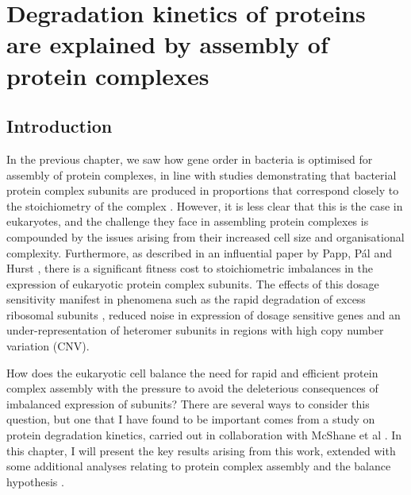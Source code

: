 \documentclass[a4paper,11pt,twoside,openright]{scrbook}
\begin{document}
\chapter{Degradation kinetics of proteins are explained by assembly of protein complexes}\label{chapter:degradation}

\section{Introduction}
In the previous chapter, we saw how gene order in bacteria is optimised for assembly of protein complexes, in line with studies demonstrating that bacterial protein complex subunits are produced in proportions that correspond closely to the stoichiometry of the complex \cite{Li2014b,Burkhardt2017}. However, it is less clear that this is the case in eukaryotes, and the challenge they face in assembling protein complexes is compounded by the issues arising from their increased cell size and organisational complexity. Furthermore, as described in an influential paper by Papp, Pál and Hurst \cite{Papp2003}, there is a significant fitness cost to stoichiometric imbalances in the expression of eukaryotic protein complex subunits. The effects of this dosage sensitivity manifest in phenomena such as the rapid degradation of excess ribosomal subunits \cite{Warner1999,Sung2016}, reduced noise in expression of dosage sensitive genes \cite{Lehner2008} and an under-representation of heteromer subunits in regions with high copy number variation \cite{Schuster-Bockler2010} (CNV).

How does the eukaryotic cell balance the need for rapid and efficient protein complex assembly with the pressure to avoid the deleterious consequences of imbalanced expression of subunits? There are several ways to consider this question, but one that I have found to be important comes from a study on protein degradation kinetics, carried out in collaboration with McShane et al \cite{McShane2016}. In this chapter, I will present the key results arising from this work, extended with some additional analyses relating to protein complex assembly and the balance hypothesis \cite{Papp2003}.
\end{document}

